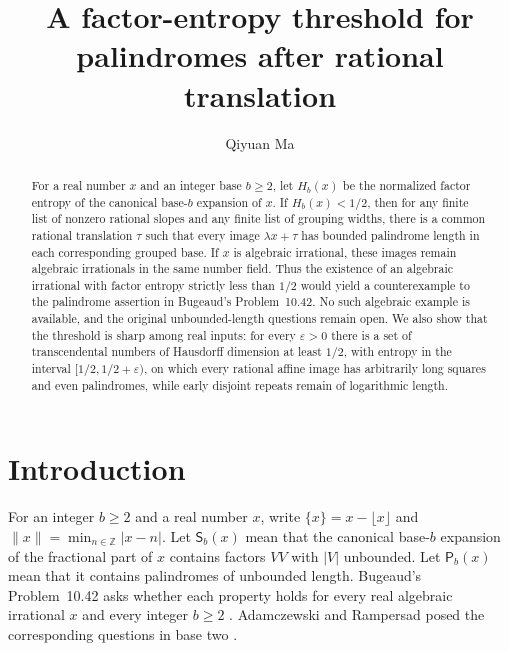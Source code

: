 \documentclass[11pt,reqno,a4paper]{amsart}
\title[A factor-entropy threshold for rational translations]
{A factor-entropy threshold for palindromes after rational translation}
\date{}
\theoremstyle{remark}
\newcommand{\Z}{\mathbb Z}
\newcommand{\dist}[1]{\lVert#1\rVert}
\begin{document}
\author[Qiyuan Ma]{Qiyuan Ma\\[6pt]\protect\usebox{\affilbox}}

\begin{abstract}
For a real number $x$ and an integer base $b\ge2$, let $H_b(x)$ be the normalized factor entropy of the canonical base-$b$ expansion of $x$. If $H_b(x)<1/2$, then for any finite list of nonzero rational slopes and any finite list of grouping widths, there is a common rational translation $\tau$ such that every image $\lambda x+\tau$ has bounded palindrome length in each corresponding grouped base. If $x$ is algebraic irrational, these images remain algebraic irrationals in the same number field. Thus the existence of an algebraic irrational with factor entropy strictly less than $1/2$ would yield a counterexample to the palindrome assertion in Bugeaud's Problem~10.42. No such algebraic example is available, and the original unbounded-length questions remain open. We also show that the threshold is sharp among real inputs: for every $\varepsilon>0$ there is a set of transcendental numbers of Hausdorff dimension at least $1/2$, with entropy in the interval $[1/2,1/2+\varepsilon)$, on which every rational affine image has arbitrarily long squares and even palindromes, while early disjoint repeats remain of logarithmic length.
\end{abstract}
\maketitle

\section{Introduction}\label{sec:intro}

For an integer $b\ge2$ and a real number $x$, write $\{x\}=x-\lfloor x\rfloor$ and $\dist{x}=\min_{n\in\Z}|x-n|$. Let $\mathsf S_b(x)$ mean that the canonical base-$b$ expansion of the fractional part of $x$ contains factors $VV$ with $|V|$ unbounded. Let $\mathsf P_b(x)$ mean that it contains palindromes of unbounded length. Bugeaud's Problem~10.42 asks whether each property holds for every real algebraic irrational $x$ and every integer $b\ge2$ \cite[p.~220]{Bugeaud}. Adamczewski and Rampersad posed the corresponding questions in base two \cite{AR}.
\end{document}
